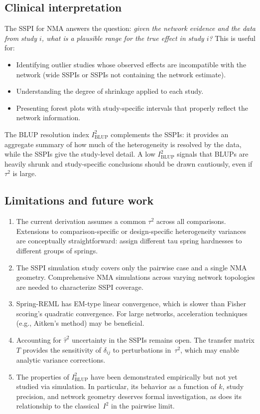 \documentclass[12pt]{article}
\begin{document}
\subsection{Clinical interpretation}

The SSPI for NMA answers the question: \emph{given the network evidence
and the data from study $i$, what is a plausible range for the true
effect in study $i$?}  This is useful for:
\begin{itemize}
  \item Identifying outlier studies whose observed effects are
    incompatible with the network (wide SSPIs or SSPIs not containing
    the network estimate).
  \item Understanding the degree of shrinkage applied to each study.
  \item Presenting forest plots with study-specific intervals that
    properly reflect the network information.
\end{itemize}

The BLUP resolution index $I^2_{\mathrm{BLUP}}$ complements the SSPIs:
it provides an aggregate summary of how much of the heterogeneity is
resolved by the data, while the SSPIs give the study-level detail.  A
low $I^2_{\mathrm{BLUP}}$ signals that BLUPs are heavily shrunk and
study-specific conclusions should be drawn cautiously, even if
$\tau^2$ is large.

\subsection{Limitations and future work}

\begin{enumerate}
  \item The current derivation assumes a common $\tau^2$ across all
    comparisons.  Extensions to comparison-specific or design-specific
    heterogeneity variances are conceptually straightforward: assign
    different tau spring hardnesses to different groups of springs.
  \item The SSPI simulation study covers only the pairwise case and a
    single NMA geometry.  Comprehensive NMA simulations across varying
    network topologies are needed to characterize SSPI coverage.
  \item Spring-REML has EM-type linear convergence, which is slower than
    Fisher scoring's quadratic convergence.  For large networks,
    acceleration techniques (e.g., Aitken's method) may be beneficial.
  \item Accounting for $\hat\tau^2$ uncertainty in the SSPIs remains
    open.  The transfer matrix $T$ provides the sensitivity of
    $\delta_{ij}$ to perturbations in~$\tau^2$, which may enable
    analytic variance corrections.
  \item The properties of $I^2_{\mathrm{BLUP}}$ have been demonstrated
    empirically but not yet studied via simulation.  In particular, its
    behavior as a function of $k$, study precision, and network geometry
    deserves formal investigation, as does its relationship to the
    classical~$I^2$ in the pairwise limit.
\end{enumerate}
\end{document}
